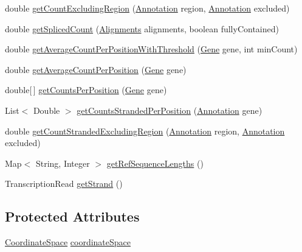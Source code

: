 \begin{DoxyCompactItemize}
\item 
double \hyperlink{classumms_1_1core_1_1model_1_1_alignment_model_a6fc7f8dfbc07c036d0701237b917ec80}{get\+Count\+Excluding\+Region} (\hyperlink{interfaceumms_1_1core_1_1annotation_1_1_annotation}{Annotation} region, \hyperlink{interfaceumms_1_1core_1_1annotation_1_1_annotation}{Annotation} excluded)
\item 
double \hyperlink{classumms_1_1core_1_1model_1_1_alignment_model_a45b55e717dcb570d8a3853360c92f272}{get\+Spliced\+Count} (\hyperlink{classbroad_1_1pda_1_1datastructures_1_1_alignments}{Alignments} alignments, boolean fully\+Contained)
\item 
double \hyperlink{classumms_1_1core_1_1model_1_1_alignment_model_afdbc71f66c4a8e02cf59c6525c668ad0}{get\+Average\+Count\+Per\+Position\+With\+Threshold} (\hyperlink{classumms_1_1core_1_1annotation_1_1_gene}{Gene} gene, int min\+Count)
\item 
double \hyperlink{classumms_1_1core_1_1model_1_1_alignment_model_a1eedf20d46a117cc86b53632a8cff0cb}{get\+Average\+Count\+Per\+Position} (\hyperlink{classumms_1_1core_1_1annotation_1_1_gene}{Gene} gene)
\item 
double\mbox{[}$\,$\mbox{]} \hyperlink{classumms_1_1core_1_1model_1_1_alignment_model_a2ad06cbab73fda69b7f399d1980adde7}{get\+Counts\+Per\+Position} (\hyperlink{classumms_1_1core_1_1annotation_1_1_gene}{Gene} gene)
\item 
List$<$ Double $>$ \hyperlink{classumms_1_1core_1_1model_1_1_alignment_model_a02809d43b5a67c1a9c8942b7d399c1a2}{get\+Counts\+Stranded\+Per\+Position} (\hyperlink{interfaceumms_1_1core_1_1annotation_1_1_annotation}{Annotation} gene)
\item 
double \hyperlink{classumms_1_1core_1_1model_1_1_alignment_model_a4314840666a311fe81b2f0f0340d0f7b}{get\+Count\+Stranded\+Excluding\+Region} (\hyperlink{interfaceumms_1_1core_1_1annotation_1_1_annotation}{Annotation} region, \hyperlink{interfaceumms_1_1core_1_1annotation_1_1_annotation}{Annotation} excluded)
\item 
Map$<$ String, Integer $>$ \hyperlink{classumms_1_1core_1_1model_1_1_alignment_model_aa8168915afb028e9db4ecaf28338a6e5}{get\+Ref\+Sequence\+Lengths} ()
\item 
Transcription\+Read \hyperlink{classumms_1_1core_1_1model_1_1_alignment_model_ac53691d7b9efa13bc4ea3350d0ee83d3}{get\+Strand} ()
\end{DoxyCompactItemize}
\subsection*{Protected Attributes}
\begin{DoxyCompactItemize}
\item 
\hyperlink{interfaceumms_1_1core_1_1coordinatesystem_1_1_coordinate_space}{Coordinate\+Space} \hyperlink{classumms_1_1core_1_1model_1_1_alignment_model_a39ef275175b500df6548f8ec18949dfe}{coordinate\+Space}
\end{DoxyCompactItemize}


